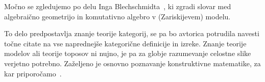


Močno se zgledujemo po delu Inga Blechschmidta~\cite{Blechschmidt17,
  Blechschmidt18, Blechschmidt20, Blechschmidt22}, ki zgradi slovar med
algebraično geometrijo in komutativno algebro v (Zariskijevem) modelu.

To delo predpostavlja znanje teorije kategorij, se pa bo avtorica potrudila
navesti točne citate na vse naprednejše kategorične definicije in izreke. Znanje
teorije modelov ali teorije toposov ni nujno, je pa za globje razumevanje
celostne slike verjetno potrebno. Zaželjeno je osnovno poznavanje konstruktivne
matematike, za kar priporočamo~\cite{Bauer16, Greenleaf20, Bishop85}.

